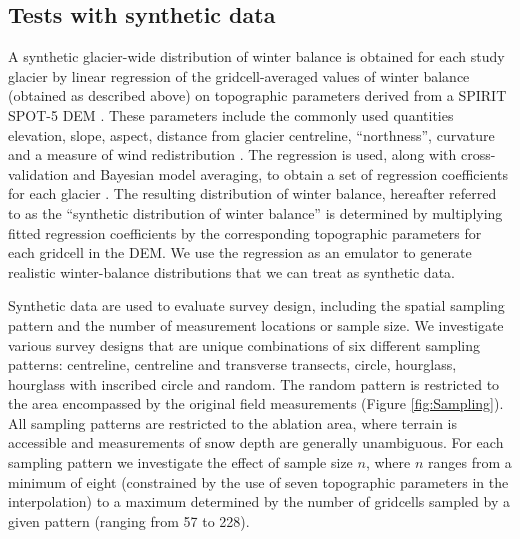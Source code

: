 \documentclass{article}
\begin{document}
\subsection{Tests with synthetic data}

A synthetic glacier-wide distribution of winter balance is obtained for each study glacier by linear regression of the gridcell-averaged values of winter balance (obtained as described above) on topographic parameters derived from a SPIRIT SPOT-5 DEM \citep{Korona2009}. 
These parameters include the commonly used quantities elevation, slope, aspect, distance from glacier centreline, ``northness'', curvature and a measure of wind redistribution \citep[e.g.][]{McGrath2015}. The regression is used, along with cross-validation and Bayesian model averaging, to obtain a set of regression coefficients for each glacier \citep{Pulwicki2017}. The resulting distribution of winter balance, hereafter referred to as the ``synthetic distribution of winter balance'' is determined by multiplying fitted regression coefficients by the corresponding topographic parameters for each gridcell in the DEM. We use the regression as an emulator to generate realistic winter-balance distributions that we can treat as synthetic data. 

Synthetic data are used to evaluate survey design, including the spatial sampling pattern and the number of measurement locations or sample size. 
We investigate various survey designs that are unique combinations of six different sampling patterns: centreline, centreline and transverse transects, circle, hourglass, hourglass with inscribed circle and random. The random pattern is restricted to the area encompassed by the original field measurements (Figure \ref{fig:Sampling}). 
All sampling patterns are restricted to the ablation area, where terrain is accessible and measurements of snow depth are generally unambiguous. 
For each sampling pattern we investigate the effect of sample size $n$, where $n$ ranges from a minimum of eight (constrained by the use of seven topographic parameters in the interpolation) to a maximum determined by the number of gridcells sampled by a given pattern (ranging from 57 to 228). 
\end{document}
